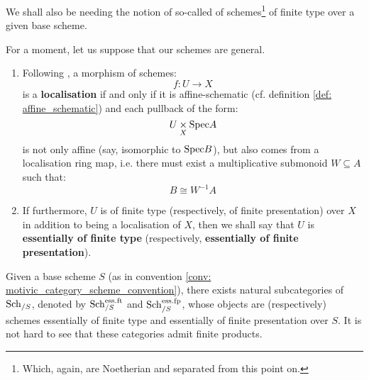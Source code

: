             We shall also be needing the notion of so-called  of schemes\footnote{Which, again, are Noetherian and separated from this point on.} of finite type over a given base scheme.  
            \begin{definition} \label{def: scheme_morphisms_essentially_of_finite_type}
                For a moment, let us suppose that our schemes are general.
                \begin{enumerate}
                    \item Following \cite[Definition 2.1]{nayak_essentially_of_finite_type}, a morphism of schemes:
                        $$f: U \to X$$
                    is a \textbf{localisation} if and only if it is affine-schematic (cf. definition \ref{def: affine_schematic}) and each pullback of the form:
                        $$U \x_X \Spec A$$
                    is not only affine (say, isomorphic to $\mathrm{Spec} B$), but also comes from a localisation ring map, i.e. there must exist a multiplicative submonoid $W \subseteq A$ such that:
                        $$B \cong W^{-1}A$$
                    \item If furthermore, $U$ is of finite type (respectively, of finite presentation) over $X$ in addition to being a localisation of $X$, then we shall say that $U$ is \textbf{essentially of finite type} (respectively, \textbf{essentially of finite presentation}).
                \end{enumerate}
            \end{definition}
            \begin{remark}
                Given a base scheme $S$ (as in convention \ref{conv: motivic_category_scheme_convention}), there exists natural subcategories of $\mathrm{Sch}_{/S}$, denoted by $\mathrm{Sch}_{/S}^{\mathrm{ess}.\mathrm{ft}}$ and $\mathrm{Sch}_{/S}^{\mathrm{ess}.\mathrm{fp}}$, whose objects are (respectively) schemes essentially of finite type and essentially of finite presentation over $S$. It is not hard to see that these categories admit finite products.
            \end{remark}
            
